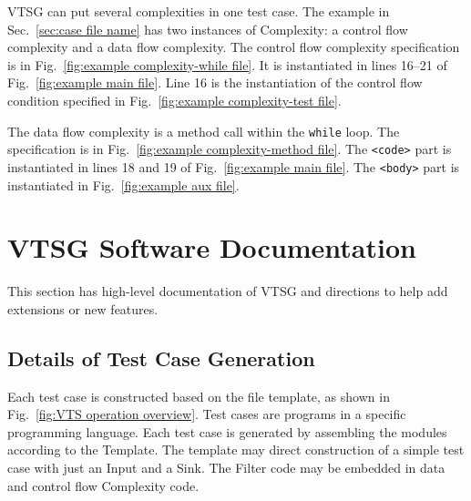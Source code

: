 VTSG can put several complexities in one test case.
The example in Sec.~\ref{sec:case file name} has two instances of
Complexity: a control flow complexity and a data flow complexity.
The control flow complexity specification is in
Fig.~\ref{fig:example complexity-while file}.  It is instantiated in
lines 16--21 of
Fig.~\ref{fig:example main file}.  Line 16 is the instantiation of
the control flow condition
specified in Fig.~\ref{fig:example complexity-test file}.

The data flow complexity is a method call within the \verb|while| loop.
The specification
is in Fig.~\ref{fig:example complexity-method file}.
The \verb|<code>|
part is instantiated in lines 18 and 19 of
Fig.~\ref{fig:example main file}.
The \verb|<body>| part is instantiated in
Fig.~\ref{fig:example aux file}.

\section{VTSG Software Documentation}
\label{sec: high-level documentation}

This section has high-level documentation of VTSG and directions to help add
extensions or new features.

\subsection{Details of Test Case Generation}
\label{sec: generation detail}

Each test case is constructed based on the file template, as shown in
Fig.~\ref{fig:VTS operation overview}. Test cases are programs in a specific
programming language.  Each test case is generated by assembling the modules
according to the Template.  The template may direct construction of a simple
test case with just an Input and a Sink.  The Filter code may be embedded in
data and control flow Complexity code.


